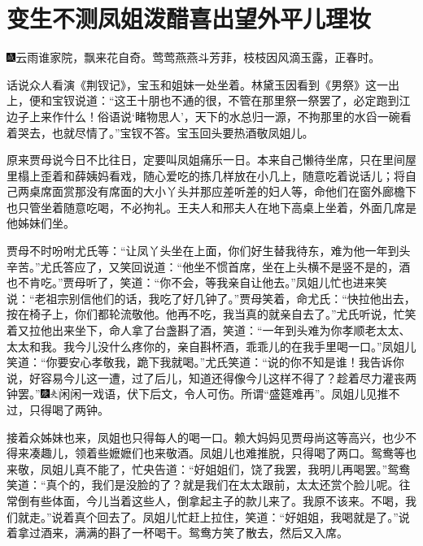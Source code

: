 

\chapter{变生不测凤姐泼醋\hspace{.5em}喜出望外平儿理妆}

{\includegraphics[width=3mm]{../Images/00005}云雨谁家院，飘来花自奇。莺莺燕燕斗芳菲，枝枝因风滴玉露，正春时。}

话说众人看演《荆钗记》，宝玉和姐妹一处坐着。林黛玉因看到《男祭》这一出上，便和宝钗说道：``这王十朋也不通的很，不管在那里祭一祭罢了，必定跑到江边子上来作什么！俗语说`睹物思人'，天下的水总归一源，不拘那里的水舀一碗看着哭去，也就尽情了。''宝钗不答。宝玉回头要热酒敬凤姐儿。

原来贾母说今日不比往日，定要叫凤姐痛乐一日。本来自己懒待坐席，只在里间屋里榻上歪着和薛姨妈看戏，随心爱吃的拣几样放在小几上，随意吃着说话儿；将自己两桌席面赏那没有席面的大小丫头并那应差听差的妇人等，命他们在窗外廊檐下也只管坐着随意吃喝，不必拘礼。王夫人和邢夫人在地下高桌上坐着，外面几席是他姊妹们坐。

贾母不时吩咐尤氏等：``让凤丫头坐在上面，你们好生替我待东，难为他一年到头辛苦。''尤氏答应了，又笑回说道：``他坐不惯首席，坐在上头横不是竖不是的，酒也不肯吃。''贾母听了，笑道：``你不会，等我亲自让他去。''凤姐儿忙也进来笑说：``老祖宗别信他们的话，我吃了好几钟了。''贾母笑着，命尤氏：``快拉他出去，按在椅子上，你们都轮流敬他。他再不吃，我当真的就亲自去了。''尤氏听说，忙笑着又拉他出来坐下，命人拿了台盏斟了酒，笑道：``一年到头难为你孝顺老太太、太太和我。我今儿没什么疼你的，亲自斟杯酒，乖乖儿的在我手里喝一口。''凤姐儿笑道：``你要安心孝敬我，跪下我就喝。''尤氏笑道：``说的你不知是谁！我告诉你说，好容易今儿这一遭，过了后儿，知道还得像今儿这样不得了？趁着尽力灌丧两钟罢。''{\includegraphics[width=3mm]{../Images/00004}\includegraphics[width=3mm]{../Images/00012}\footnotesize \kaishu 闲闲一戏语，伏下后文，令人可伤。所谓``盛筵难再''。}凤姐儿见推不过，只得喝了两钟。

接着众姊妹也来，凤姐也只得每人的喝一口。赖大妈妈见贾母尚这等高兴，也少不得来凑趣儿，领着些嬷嬷们也来敬酒。凤姐儿也难推脱，只得喝了两口。鸳鸯等也来敬，凤姐儿真不能了，忙央告道：``好姐姐们，饶了我罢，我明儿再喝罢。''鸳鸯笑道：``真个的，我们是没脸的了？就是我们在太太跟前，太太还赏个脸儿呢。往常倒有些体面，今儿当着这些人，倒拿起主子的款儿来了。我原不该来。不喝，我们就走。''说着真个回去了。凤姐儿忙赶上拉住，笑道：``好姐姐，我喝就是了。''说着拿过酒来，满满的斟了一杯喝干。鸳鸯方笑了散去，然后又入席。

